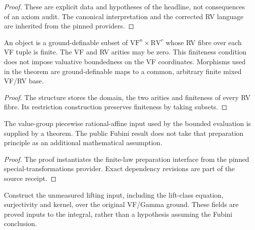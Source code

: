 \begin{proof}
These are explicit data and hypotheses of the headline, not consequences of an axiom audit. The canonical interpretation and the corrected RV language are inherited from the pinned providers.
\end{proof}

\begin{definition}
\label{objects}
\leanok
{}
An object is a ground-definable subset of $\mathrm{VF}^{n}\times\mathrm{RV}^{r}$ whose RV fibre over each VF tuple is finite. The VF and RV arities may be zero. This finiteness condition does not impose valuative boundedness on the VF coordinates. Morphisms used in the theorem are ground-definable maps to a common, arbitrary finite mixed VF/RV base.
\end{definition}

\begin{proof}
The structure stores the domain, the two arities and finiteness of every RV fibre. Its restriction construction preserves finiteness by taking subsets.
\end{proof}

\begin{lemma}
\label{linear}
\leanok
{}
The value-group piecewise rational-affine input used by the bounded evaluation is supplied by a theorem. The public Fubini result does not take that preparation principle as an additional mathematical assumption.
\end{lemma}

\begin{proof}
The proof instantiates the finite-law preparation interface from the pinned special-transformations provider. Exact dependency revisions are part of the source receipt.
\end{proof}

\begin{definition}
\label{lifting}
\leanok
{}
Construct the unmeasured lifting input, including the lift-class equation, surjectivity and kernel, over the original VF/Gamma ground. These fields are proved inputs to the integral, rather than a hypothesis assuming the Fubini conclusion.
\end{definition}

